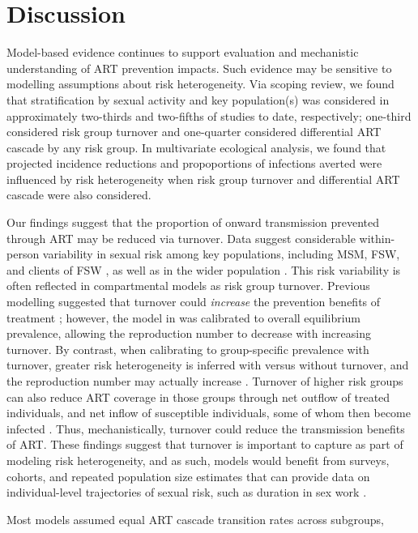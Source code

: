 \section{Discussion}
\label{s:disc}
Model-based evidence continues to support
evaluation and mechanistic understanding of ART prevention impacts.
Such evidence may be sensitive to modelling assumptions about risk heterogeneity.
Via scoping review, we found that stratification by sexual activity and key population(s)
was considered in approximately two-thirds and two-fifths of studies to date, respectively;
one-third considered risk group turnover and one-quarter considered differential ART cascade by any risk group.
In multivariate ecological analysis, we found that
projected incidence reductions and propoportions of infections averted were influenced by
risk heterogeneity when risk group turnover and differential ART cascade were also considered.
\par
Our findings suggest that the proportion of onward transmission prevented through ART
may be reduced via turnover.
Data suggest considerable within-person variability in sexual risk among key populations,
including MSM, FSW, and clients of FSW \cite{Fazito2012,Romero-Severson2012,Roberts2020},
as well as in the wider population \cite{Houle2018}.
This risk variability is often reflected in compartmental models as risk group turnover.
Previous modelling suggested that
turnover could \emph{increase} the prevention benefits of treatment \cite{Henry2015};
however, the model in \cite{Henry2015} was calibrated to overall equilibrium prevalence,
allowing the reproduction number to decrease with increasing turnover.
By contrast, when calibrating to group-specific prevalence with turnover,
greater risk heterogeneity is inferred with versus without turnover,
and the reproduction number may actually increase \cite{Knight2020}.
Turnover of higher risk groups can also reduce ART coverage in those groups through
net outflow of treated individuals, and net inflow of susceptible individuals,
some of whom then become infected \cite{Knight2020}.
Thus, mechanistically, turnover could reduce the transmission benefits of ART.
These findings suggest that turnover is important to capture as part of modeling risk heterogeneity,
and as such, models would benefit from surveys, cohorts, and repeated population size estimates
that can provide data on individual-level trajectories of sexual risk,
such as duration in sex work \cite{Watts2010}.
\par
Most models assumed equal ART cascade transition rates across subgroups,
